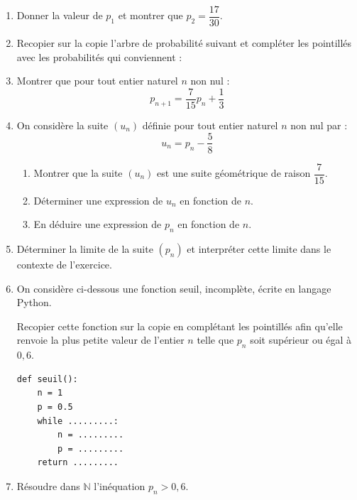 \documentclass[10pt]{article}
\providecommand{\N}{\mathbb{N}}
\begin{document}
\begin{enumerate}
\item Donner la valeur de $p_1$ et montrer que $p_2 = \dfrac{17}{30}$.

\item Recopier sur la copie l'arbre de probabilité suivant et compléter les pointillés avec les probabilités qui conviennent :

\begin{center}
\end{center}

\item Montrer que pour tout entier naturel $n$ non nul :
\[
p_{n+1}=\dfrac{7}{15}p_n+\dfrac{1}{3}
\]

\item On considère la suite $\left(u_n\right)$ définie pour tout entier naturel $n$ non nul par :
\[
u_n=p_n-\dfrac{5}{8}
\]

\begin{enumerate}
\item Montrer que la suite $\left(u_n\right)$ est une suite géométrique de raison $\dfrac{7}{15}$.
\item Déterminer une expression de $u_n$ en fonction de $n$.
\item En déduire une expression de $p_n$ en fonction de $n$.
\end{enumerate}

\item Déterminer la limite de la suite $\left(p_n\right)$ et interpréter cette limite dans le contexte de l'exercice.

\item On considère ci-dessous une fonction seuil, incomplète, écrite en langage Python.

Recopier cette fonction sur la copie en complétant les pointillés afin qu'elle renvoie la plus petite valeur de l'entier $n$ telle que $p_n$ soit supérieur ou égal à $0,6$.

\begin{Verbatim}[frame=single]
def seuil():
    n = 1
    p = 0.5
    while .........:
        n = .........
        p = .........
    return .........
\end{Verbatim}

\item Résoudre dans $\N$ l'inéquation $p_n > 0,6$.
\end{enumerate}
\end{document}
